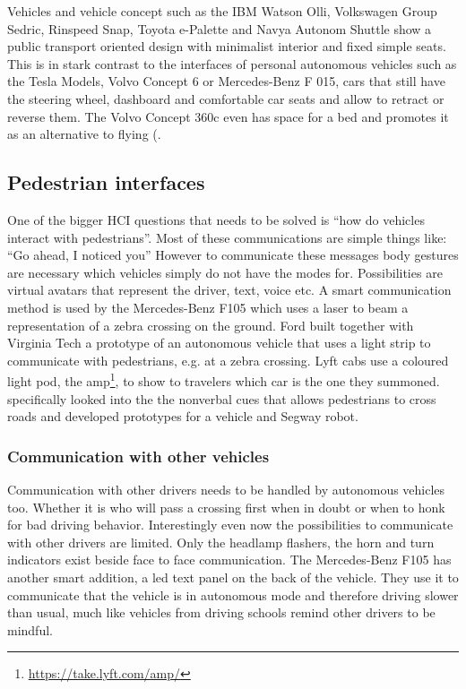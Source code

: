 Vehicles and vehicle concept such as the IBM Watson Olli, Volkswagen Group Sedric, Rinspeed Snap, Toyota e-Palette and Navya Autonom Shuttle show a public transport oriented design with minimalist interior and fixed simple seats. This is in stark contrast to the interfaces of personal autonomous vehicles such as the Tesla Models, Volvo Concept 6 or Mercedes-Benz F 015, cars that still have the steering wheel, dashboard and comfortable car seats and allow to retract or reverse them. The Volvo Concept 360c even has space for a bed and promotes it as an alternative to flying (.   

\subsection{Pedestrian interfaces}\label{ssec:pedestrian}  
One of the bigger HCI questions that needs to be solved is “how do vehicles interact with pedestrians”. Most of these communications are simple things like: “Go ahead, I noticed you” However to communicate these messages body gestures are necessary which vehicles simply do not have the modes for. Possibilities are virtual avatars that represent the driver, text, voice etc.  A smart communication method is used by the Mercedes-Benz F105 which uses a laser to beam a representation of a zebra crossing on the ground. Ford built together with Virginia Tech a prototype of an autonomous vehicle that uses a light strip to communicate with pedestrians, e.g. at a zebra crossing\cite{FordMotorCompany2017FordPeople}. Lyft cabs use a coloured light pod, the amp\footnote{\url{https://take.lyft.com/amp/}}, to show to travelers which car is the one they summoned. \cite{Mahadevan2018} specifically looked into the the nonverbal cues that allows pedestrians to cross roads and developed prototypes for a vehicle and Segway robot. 

\subsubsection{Communication with other vehicles} 
Communication with other drivers needs to be handled by autonomous vehicles too. Whether it is who will pass a crossing first when in doubt or when to honk for bad driving behavior. Interestingly even now the possibilities to communicate with other drivers are limited. Only the headlamp flashers, the horn and turn indicators exist beside face to face communication. The Mercedes-Benz F105 has another smart addition, a led text panel on the back of the vehicle. They use it to communicate that the vehicle is in autonomous mode and therefore driving slower than usual, much like vehicles from driving schools remind other drivers to be mindful.  

